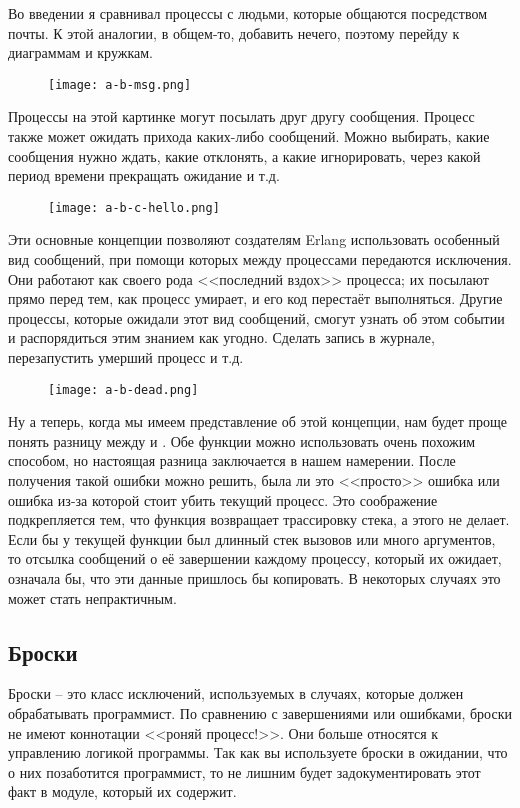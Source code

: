 Во введении я сравнивал процессы с людьми, которые общаются посредством почты. К этой аналогии, в общем\--то, добавить нечего, поэтому перейду к диаграммам и кружкам.
\begin{figure}[h!]
    \texttt{[image: a-b-msg.png]}
\end{figure}

Процессы на этой картинке могут посылать друг другу сообщения.
Процесс также может ожидать прихода каких\--либо сообщений.
Можно выбирать, какие сообщения нужно ждать, какие отклонять, а какие игнорировать, через какой период времени прекращать ожидание и т.д.
\begin{figure}[h!]
    \texttt{[image: a-b-c-hello.png]}
\end{figure}

Эти основные концепции позволяют создателям Erlang использовать особенный вид сообщений, при помощи которых между процессами передаются исключения.
Они работают как своего рода <<последний вздох>> процесса; их посылают прямо перед тем, как процесс умирает, и его код перестаёт выполняться.
Другие процессы, которые ожидали этот вид сообщений, смогут узнать об этом событии и распорядиться этим знанием как угодно.
Сделать запись в журнале, перезапустить умерший процесс и т.д.
\begin{figure}[h!]
    \texttt{[image: a-b-dead.png]}
\end{figure}

Ну а теперь, когда мы имеем представление об этой концепции, нам будет проще понять разницу между  и .
Обе функции можно использовать очень похожим способом, но настоящая разница заключается в нашем намерении.
После получения такой ошибки можно решить, была ли это <<просто>> ошибка или ошибка из\--за которой стоит убить текущий процесс.
Это соображение подкрепляется тем, что функция  возвращает трассировку стека, а  этого не делает.
Если бы у текущей функции был длинный стек вызовов или много аргументов, то отсылка сообщений о её завершении каждому процессу, который их ожидает, означала бы, что эти данные пришлось бы копировать. В некоторых случаях это может стать непрактичным.
\subsection{Броски}
\label{throws}
Броски \--- это класс исключений, используемых в случаях, которые должен обрабатывать программист.
По сравнению с завершениями  или ошибками, броски не имеют коннотации <<роняй процесс!>>.
Они больше относятся к управлению логикой программы.
Так как вы используете броски в ожидании, что о них позаботится программист, то не лишним будет задокументировать этот факт в модуле, который их содержит.

